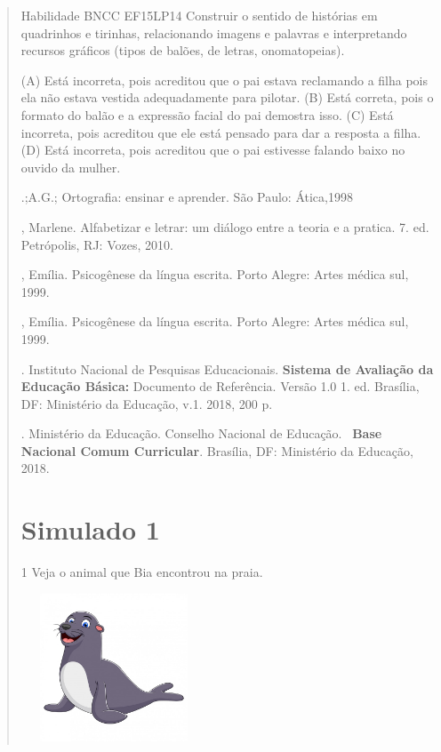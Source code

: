 \begin{verse}
{Habilidade BNCC EF15LP14 Construir o sentido de histórias em quadrinhos
e tirinhas, relacionando imagens e palavras e interpretando recursos
gráficos (tipos de balões, de letras, onomatopeias).}

(A) Está incorreta, pois acreditou que o pai estava reclamando a filha
pois ela não estava vestida adequadamente para pilotar.
(B) Está correta, pois o formato do balão e a expressão facial do pai
demostra isso.
(C) Está incorreta, pois acreditou que ele está pensado para dar a
resposta a filha.
(D) Está incorreta, pois acreditou que o pai estivesse falando baixo no
ouvido da mulher.


\begin{bibliohedra}
.;A.G.; Ortografia: ensinar e aprender. São Paulo: Ática,1998

, Marlene. Alfabetizar e letrar: um diálogo entre a teoria e a
pratica. 7. ed. Petrópolis, RJ: Vozes, 2010.

, Emília. Psicogênese da língua escrita. Porto Alegre: Artes
médica sul, 1999.

, Emília. Psicogênese da língua escrita. Porto Alegre: Artes
médica sul, 1999.

. Instituto Nacional de Pesquisas Educacionais. \textbf{Sistema de
Avaliação da Educação Básica:} Documento de Referência. Versão 1.0 1.
ed. Brasília, DF: Ministério da Educação, v.1. 2018, 200 p.

. Ministério da Educação. Conselho Nacional de Educação.~
\textbf{Base Nacional Comum Curricular}. Brasília, DF: Ministério da
Educação, 2018.
\end{bibliohedra}

\chapter{Simulado 1}

\num{1} Veja o animal que Bia encontrou na praia.

\includegraphics[width=2.16528in,height=1.72778in]{media/image139.jpeg}


\end{verse}
